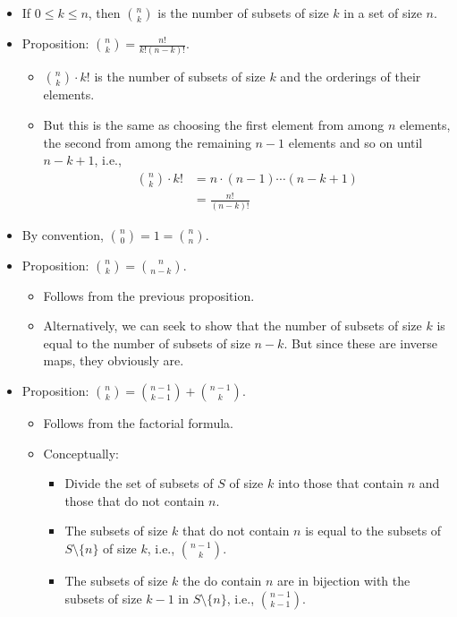 \documentclass[../apprentice.tex]{subfiles}
\begin{document}
\begin{itemize}
    \item If $0\leq k\leq n$, then $\binom{n}{k}$ is the number of subsets of size $k$ in a set of size $n$.
    \item Proposition: $\binom{n}{k}=\frac{n!}{k!(n-k)!}$.
    \begin{itemize}
        \item $\binom{n}{k}\cdot k!$ is the number of subsets of size $k$ and the orderings of their elements.
        \item But this is the same as choosing the first element from among $n$ elements, the second from among the remaining $n-1$ elements and so on until $n-k+1$, i.e.,
        \begin{align*}
            \binom{n}{k}\cdot k! &= n\cdot(n-1)\cdots(n-k+1)\\
            &= \frac{n!}{(n-k)!}
        \end{align*}
    \end{itemize}
    \item By convention, $\binom{n}{0}=1=\binom{n}{n}$.
    \item Proposition: $\binom{n}{k}=\binom{n}{n-k}$.
    \begin{itemize}
        \item Follows from the previous proposition.
        \item Alternatively, we can seek to show that the number of subsets of size $k$ is equal to the number of subsets of size $n-k$. But since these are inverse maps, they obviously are.
    \end{itemize}
    \item Proposition: $\binom{n}{k}=\binom{n-1}{k-1}+\binom{n-1}{k}$.
    \begin{itemize}
        \item Follows from the factorial formula.
        \item Conceptually:
        \begin{itemize}
            \item Divide the set of subsets of $S$ of size $k$ into those that contain $n$ and those that do not contain $n$.
            \item The subsets of size $k$ that do not contain $n$ is equal to the subsets of $S\setminus\{n\}$ of size $k$, i.e., $\binom{n-1}{k}$.
            \item The subsets of size $k$ the do contain $n$ are in bijection with the subsets of size $k-1$ in $S\setminus\{n\}$, i.e., $\binom{n-1}{k-1}$.
        \end{itemize}

\end{itemize}
\end{itemize}
\end{document}
